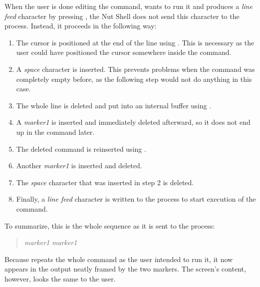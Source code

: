 \documentclass[paper=a4,twoside,abstract=on,cleardoublepage=empty,numbers=noenddot,toc=bib,12pt,appendixprefix=true]{scrreprt}
\begin{document}
When the user is done editing the command, wants to run it and produces a \emph{line feed} character by pressing , the Nut Shell does not send this character to the process. Instead, it proceeds in the following way:

\begin{enumerate}
    \item The cursor is positioned at the end of the line using . This is necessary as the user could have positioned the cursor somewhere inside the command.
    \item A \emph{space} character is inserted. This prevents problems when the command was completely empty before, as the following step would not do anything in this case.
    \item The whole line is deleted and put into an internal buffer using \mbox{}.
    \item A \emph{marker1} is inserted and immediately deleted afterward, so it does not end up in the command later.
    \item The deleted command is reinserted using .
    \item Another \emph{marker1} is inserted and deleted.
    \item The \emph{space} character that was inserted in step 2 is deleted.
    \item Finally, a \emph{line feed} character is written to the process to start execution of the command.
\end{enumerate}

To summarize, this is the whole sequence as it is sent to the process:

\begin{quote}
       \emph{marker1}   \emph{marker1}   \keys{\return}
\end{quote}

Because  repeats the whole command as the user intended to run it, it now appears in the output neatly framed by the two markers. The screen's content, however, looks the same to the user.
\end{document}
